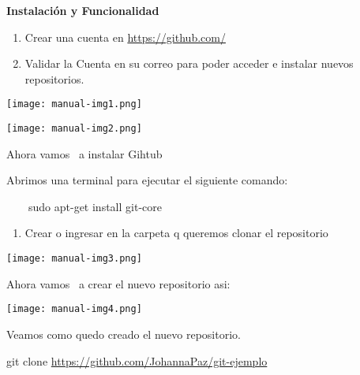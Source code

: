 \documentclass[a4paper]{article}
\title{}
\author{johanna }
\date{2015-11-16T09:35:55.320384018}
\newcommand\textstyleFuentedeprrafopredeter[1]{#1}
\newcounter{saveenum}
\newcommand\liststyleLi{%
\renewcommand\theenumi{\arabic{enumi}}
\renewcommand\theenumii{\alph{enumii}}
\renewcommand\theenumiii{\roman{enumiii}}
\renewcommand\theenumiv{\arabic{enumiv}}
\renewcommand\labelenumi{\theenumi.}
\renewcommand\labelenumii{\theenumii.}
\renewcommand\labelenumiii{\theenumiii.}
\renewcommand\labelenumiv{\theenumiv.}
}
\begin{document}
\clearpage\clearpage\setcounter{page}{1}\pagestyle{MP}
{\centering\sffamily\bfseries
Instalaci\'on y Funcionalidad
\par}

\liststyleLi
\begin{enumerate}
\item \textstyleFuentedeprrafopredeter{\textsf{Crear una cuenta en
}}\url{https://github.com/}
\item {\sffamily
Validar la Cuenta en su correo para poder acceder e instalar nuevos
repositorios.}
\end{enumerate}


\begin{center}
\texttt{[image: manual-img1.png]}
\end{center}

\bigskip



\begin{center}
\texttt{[image: manual-img2.png]}
\end{center}
{\sffamily
Ahora vamos \ a instalar Gihtub}

{\sffamily
Abrimos una terminal para ejecutar el siguiente comando:}

{\sffamily
\ \ \ \ sudo apt-get install git-core}

\liststyleLi
\setcounter{saveenum}{\value{enumi}}
\begin{enumerate}
\setcounter{enumi}{\value{saveenum}}
\item {\sffamily
Crear o ingresar en la carpeta q queremos clonar el repositorio}
\end{enumerate}

\bigskip



\begin{center}
\texttt{[image: manual-img3.png]}
\end{center}
{\sffamily
Ahora vamos \ a crear el nuevo repositorio asi:}


\bigskip



\begin{center}
\texttt{[image: manual-img4.png]}
\end{center}

\bigskip

{\sffamily
Veamos como quedo creado el nuevo repositorio.}

\textstyleFuentedeprrafopredeter{\textsf{\newline
git clone }}\url{https://github.com/JohannaPaz/git-ejemplo}
\end{document}
